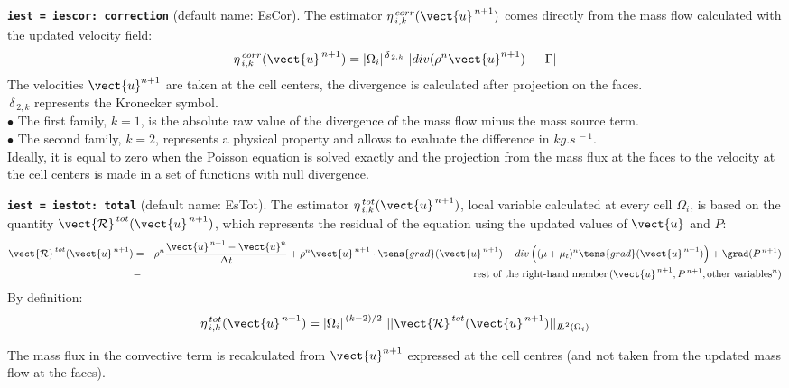 {\tt \bf iest = iescor: correction}  (default name: EsCor).
The estimator $ \eta^{\,corr}_{\,i,k}(\vect{u}^{\,n+1})$ comes directly
from the mass flow calculated with the updated velocity field:
\begin{eqnarray*}
            \eta^{\,corr}_{\,i,k}(\vect{u}^{\,n+1})=
|\Omega_i|^{\,\delta_{\,2,k}}\ |div (\rho^n \vect{u}^{n+1}) -\ \Gamma|
\end{eqnarray*}
The velocities $\vect{u}^{n+1}$ are taken at the cell centers,
the divergence is calculated after projection on the faces.\\
            $ \,\delta_{\,2,k}$ represents the Kronecker symbol.\\
\hspace*{0.5cm}$\bullet$ The first family, $k=1$, is the absolute raw
value of the divergence of the mass flow minus the mass source term.\\
\hspace*{0.5cm}$\bullet$ The second family, $k=2$, represents a physical
property and allows to evaluate the difference in $kg.s^{\,-1}$.\\
Ideally, it is equal to zero when the Poisson equation is solved exactly and
the projection from the mass flux at the faces to the velocity at the cell
centers is made in a set of  functions with null divergence.

{\tt \bf iest = iestot: total} (default name: EsTot).
The estimator $ \eta^{\,tot}_{\,i,k}(\vect{u}^{\,n+1})$, local variable
calculated at every cell $\Omega_i$, is based on the quantity
$\vect{\mathcal R}^{\,tot}(\vect{u}^{\,n+1})$, which represents the
residual of the equation using the updated values of
$\vect{u}$ and $P$:
\begin{eqnarray*}
\vect{\mathcal R}^{\,tot}(\vect{u}^{\,n+1})&= & \rho^n \frac{\vect{u}^{\,n+1}-\vect{u}^n}{\Delta t}
              + \rho^n \vect{u}^{\,n+1} \cdot \tens{grad}(\vect{u}^{\,n+1})
              - div \left((\mu+\mu_t)^n \tens{grad}(\vect{u}^{\,n+1}) \right)
              + \grad(P^{\,n+1})     \\
              &- &\text{rest of the right-hand member}
                        \,(\vect{u}^{\,n+1}, P^{\,n+1}, \text{other variables}^n)
\end{eqnarray*}
By definition:
$$ \eta^{\,tot}_{\,i,k}(\vect{u}^{\,n+1})= {|\Omega_i|}^{\,(k-2)/2}\ ||\vect{\mathcal R}^{\,tot}(\vect{u}^{\,n+1})||
_{{I\hspace{-.25em}L}^{2}(\Omega_i)}$$

The mass flux in the convective term is recalculated from $\vect{u}^{n+1}$
expressed at the cell centres (and not taken from the updated mass flow at the
faces).\\

